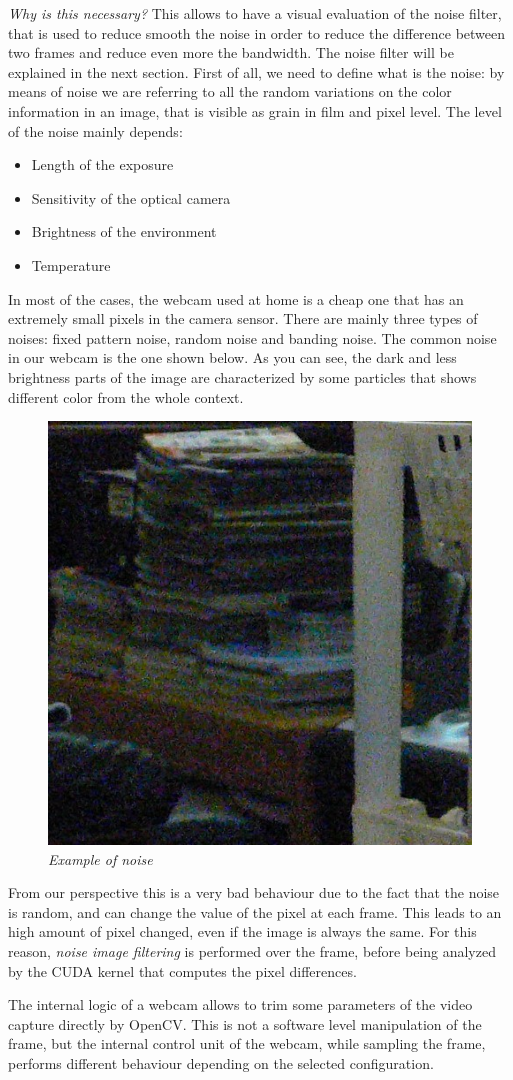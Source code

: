 \documentclass[paper=a4, fontsize=10pt]{scrartcl}	%
\begin{document}
	\textit{Why is this necessary?} This allows to have a visual evaluation of the noise filter, that is used to reduce smooth the noise in order to reduce the difference between two frames and reduce even more the bandwidth. The noise filter will be explained in the next section.\newline\newline
	First of all, we need to define what is the noise: by means of noise we are referring to all the random variations on the color information in an image, that is visible as grain in film and pixel level. The level of the noise mainly depends:
	\begin{itemize}
		\itemsep0sp
		\item Length of the exposure
		\item Sensitivity of the optical camera
		\item Brightness of the environment
		\item Temperature
	\end{itemize}
	In most of the cases, the webcam used at home is a cheap one that has an extremely small pixels in the camera sensor. There are mainly three types of noises: fixed pattern noise, random noise and banding noise. The common noise in our webcam is the one shown below. As you can see, the dark and less brightness parts of the image are characterized by some particles that shows different color from the whole context. 
	\begin{figure}[H]
		\centering
		\includegraphics[width=0.25\linewidth]{images/heatmap/noise}
		\caption{\textit{Example of noise}}
		\label{fig:noise}
	\end{figure}
	From our perspective this is a very bad behaviour due to the fact that the noise is random, and can change the value of the pixel at each frame. This leads to an high amount of pixel changed, even if the image is always the same. For this reason, \textit{noise image filtering} is performed over the frame, before being analyzed by the CUDA kernel that computes the pixel differences.\newline\newline

	The internal logic of a webcam allows to trim some parameters of the video capture directly by OpenCV. This is not a software level manipulation of the frame, but the internal control unit of the webcam, while sampling the frame, performs different behaviour depending on the selected configuration. 
	
\end{document}
